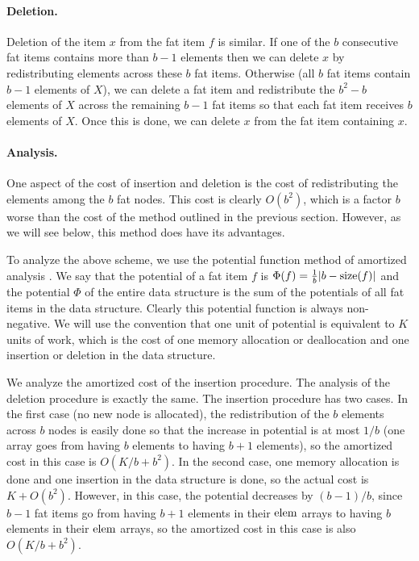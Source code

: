 \documentclass[lotsofwhite]{patmorin}
\begin{document}
\paragraph{Deletion.}
Deletion of the item $x$ from the fat item $f$ is similar.  If one of
the $b$ consecutive fat items contains more than $b-1$ elements then
we can delete $x$ by redistributing elements across these $b$ fat
items.  Otherwise (all $b$ fat items contain $b-1$ elements of $X$),
we can delete a fat item and redistribute the $b^2-b$ elements of $X$
across the remaining $b-1$ fat items so that each fat item receives
$b$ elements of $X$.  Once this is done, we can delete $x$ from the
fat item containing $x$.

\paragraph{Analysis.}
One aspect of the cost of insertion and deletion is the cost of
redistributing the elements among the $b$ fat nodes.  This cost is
clearly $O(b^2)$, which is a factor $b$ worse than the cost of the
method outlined in the previous section.  However, as we will see
below, this method does have its advantages.

To analyze the above scheme, we use the potential function method of
amortized analysis \cite{st85a}.  We say that the potential of a fat
item $f$ is $\Phi(f)=\frac{1}{b}|b-\mathrm{size}(f)|$ and the potential $\Phi$
of the entire data structure is the sum of the potentials of all fat
items in the data structure.  Clearly this potential function is
always non-negative.  We will use the convention that one unit of
potential is equivalent to $K$ units of work, which is the cost of one
memory allocation or deallocation and one insertion or deletion in the
data structure.

We analyze the amortized cost of the insertion procedure.  The
analysis of the deletion procedure is exactly the same.  The insertion
procedure has two cases.  In the first case (no new node is
allocated), the redistribution of the $b$ elements across $b$ nodes is
easily done so that the increase in potential is at most $1/b$
(one array goes from having $b$ elements to having $b+1$ elements), so
the amortized cost in this case is $O(K/b + b^2)$.  In the second
case, one memory allocation is done and one insertion in the data
structure is done, so the actual cost is $K+O(b^2)$.  However, in this
case, the potential decreases by $(b-1)/b$, since $b-1$ fat items go
from having $b+1$ elements in their $\mathrm{elem}$ arrays to having $b$
elements in their $\mathrm{elem}$ arrays, so the amortized cost in this case is
also $O(K/b + b^2)$.
\end{document}
